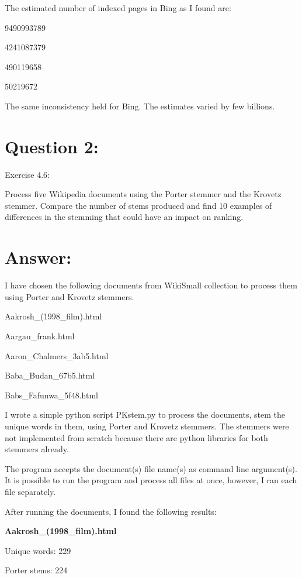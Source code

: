 \documentclass[a4paper, 11pt]{article}
\begin{document}
The estimated number of indexed pages in Bing as I found are:

9490993789

4241087379

490119658

50219672

The same inconsistency held for Bing. The estimates varied by few billions.


\section*{Question 2:}
Exercise 4.6:

Process five Wikipedia documents using the Porter stemmer and the Krovetz stemmer. Compare the number of stems produced and find 10 examples of differences in the stemming that could have an impact on ranking.

\section*{Answer:}

I have chosen the following documents from WikiSmall collection to process them using Porter and Krovetz stemmers.

Aakrosh\_(1998\_film).html

Aargau\_frank.html

Aaron\_Chalmers\_3ab5.html

Baba\_Budan\_67b5.html

Babs\_Fafunwa\_5f48.html

I wrote a simple python script PKstem.py to process the documents, stem the unique words in them, using Porter and Krovetz stemmers. The stemmers were not implemented from scratch because there are python libraries for both stemmers already.



The program accepts the document(s) file name(s) as command line argument(s). It is possible to run the program and process all files at once, however, I ran each file separately.

After running the documents, I found the following results:

\textbf{Aakrosh\_(1998\_film).html}

Unique words: 229

Porter stems: 224
\end{document}

